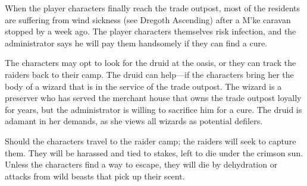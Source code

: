 When the player characters finally reach the trade outpost, most of the residents are suffering from wind sickness (see Dregoth Ascending) after a M'ke caravan stopped by a week ago. The player characters themselves risk infection, and the administrator says he will pay them handsomely if they can find a cure.

The characters may opt to look for the druid at the oasis, or they can track the raiders back to their camp. The druid can help---if the characters bring her the body of a wizard that is in the service of the trade outpost. The wizard is a preserver who has served the merchant house that owns the trade outpost loyally for years, but the administrator is willing to sacrifice him for a cure. The druid is adamant in her demands, as she views all wizards as potential defilers.

Should the characters travel to the raider camp; the raiders will seek to capture them. They will be harassed and tied to stakes, left to die under the crimson sun. Unless the characters find a way to escape, they will die by dehydration or attacks from wild beasts that pick up their scent.